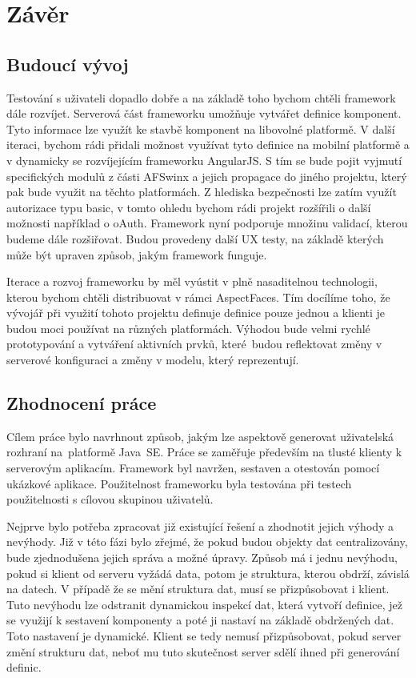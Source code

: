 \chapter{Závěr}
\section{Budoucí vývoj}
Testování s uživateli dopadlo dobře a na základě toho bychom chtěli framework dále rozvíjet. Serverová část frameworku umožňuje vytvářet definice komponent. Tyto informace lze využít ke stavbě komponent na libovolné platformě. V další iteraci, bychom rádi přidali možnost využívat tyto definice na mobilní platformě a v dynamicky se rozvíjejícím frameworku AngularJS. S tím se bude pojit vyjmutí specifických modulů z části AFSwinx a jejich propagace do jiného projektu, který pak bude využit na těchto platformách. Z hlediska bezpečnosti lze zatím využít autorizace typu basic, v tomto ohledu bychom rádi projekt rozšířili o další možnosti například o oAuth. Framework nyní podporuje množinu validací, kterou budeme dále rozšiřovat. Budou provedeny další UX testy, na základě kterých může být upraven způsob, jakým framework funguje.

Iterace a rozvoj frameworku by měl vyústit v plně nasaditelnou technologii, kterou bychom chtěli distribuovat v rámci AspectFaces. Tím docílíme toho, že vývojář při využití tohoto projektu definuje definice pouze jednou a klienti je budou moci používat na různých platformách. Výhodou bude velmi rychlé prototypování a vytváření aktivních prvků, které~budou reflektovat změny v serverové konfiguraci a změny v modelu, který reprezentují.
\section{Zhodnocení práce}
Cílem práce bylo navrhnout způsob, jakým lze aspektově generovat uživatelská rozhraní na~platformě Java~SE. Práce se zaměřuje především na tlusté klienty k serverovým aplikacím. Framework byl navržen, sestaven a otestován pomocí ukázkové aplikace. Použitelnost frameworku byla testována při testech použitelnosti s cílovou skupinou uživatelů.

Nejprve bylo potřeba zpracovat již existující řešení a zhodnotit jejich výhody a nevýhody. Již v této fázi bylo zřejmé, že pokud budou objekty dat centralizovány, bude zjednodušena jejich správa a možné úpravy. Způsob má i jednu nevýhodu, pokud si klient od serveru vyžádá data, potom je struktura, kterou obdrží, závislá na datech. V případě že se mění struktura dat, musí se přizpůsobovat i klient. Tuto nevýhodu lze odstranit dynamickou inspekcí dat, která vytvoří definice, jež se využijí k sestavení komponenty a poté ji nastaví na základě obdržených dat. Toto nastavení je dynamické. Klient se tedy nemusí přizpůsobovat, pokud server změní strukturu dat, neboť mu tuto skutečnost server sdělí ihned při generování definic.

